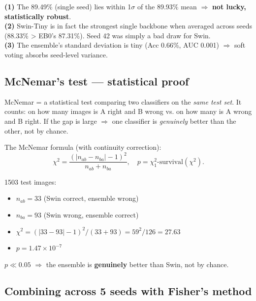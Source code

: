 \documentclass[11pt,a4paper]{article}
\begin{document}
\begin{idea}
\textbf{(1)} The 89.49\% (single seed) lies within 1$\sigma$ of the 89.93\% mean $\Rightarrow$ \textbf{not lucky, statistically robust}.\\
\textbf{(2)} Swin-Tiny is in fact the strongest single backbone when averaged across seeds (88.33\% > EB0's 87.31\%). Seed 42 was simply a bad draw for Swin.\\
\textbf{(3)} The ensemble's standard deviation is tiny (Acc 0.66\%, AUC 0.001) $\Rightarrow$ soft voting absorbs seed-level variance.
\end{idea}

\subsection{McNemar's test --- statistical proof}

\begin{simple}
McNemar = a statistical test comparing two classifiers on the \textit{same test set}. It counts: on how many images is A right and B wrong vs. on how many is A wrong and B right. If the gap is large $\Rightarrow$ one classifier is \textit{genuinely} better than the other, not by chance.
\end{simple}

The McNemar formula (with continuity correction):
\[
  \chi^2 = \frac{(|n_{ab} - n_{ba}| - 1)^2}{n_{ab} + n_{ba}}, \quad p = \chi^2_1\text{-survival}(\chi^2).
\]

\begin{example}
1503 test images:
\begin{itemize}[leftmargin=*]
  \item $n_{ab} = 33$ (Swin correct, ensemble wrong)
  \item $n_{ba} = 93$ (Swin wrong, ensemble correct)
  \item $\chi^2 = (|33-93| - 1)^2 / (33+93) = 59^2 / 126 = 27.63$
  \item $p = 1.47 \times 10^{-7}$
\end{itemize}
$p \ll 0.05$ $\Rightarrow$ the ensemble is \textbf{genuinely} better than Swin, not by chance.
\end{example}

\subsection{Combining across 5 seeds with Fisher's method}
\end{document}
